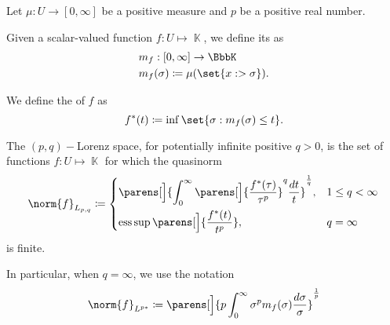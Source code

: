\begin{definition}\label{def:distribution_function}\cite[6]{BerghLofstrom1976}
  Let \( \mu: U \to [0, \infty] \) be a positive measure and \( p \) be a positive real number.

  \begin{thmenum}
     Given a scalar-valued function \( f: U \mapsto \BbbK \), we define its  as
    \begin{align*}
      &m_f: [0, \infty] \to \BbbK \\
      &m_f(\sigma) \coloneqq \mu(\set{ x :  > \sigma }).
    \end{align*}

     We define the  of \( f \) as
    \begin{equation*}
      f^*(t) \coloneqq \inf\set{ \sigma : m_f(\sigma) \leq t }.
    \end{equation*}

     The \( (p, q)-\)Lorenz space, for potentially infinite positive \( q > 0 \), is the set of functions \( f: U \mapsto \BbbK \) for which the quasinorm
    \begin{equation*}
      \norm{f}_{L_{p,q}} \coloneqq \begin{dcases}
        \parens[\Big]{\int_0^\infty \parens[\Big]{\frac {f^*(\tau)} {\tau^p}}^q \frac {d t} t}^{\frac 1 q}, &1 \leq q < \infty \\
        \ess\sup\parens[\Big]{\frac {f^*(t)} {t^p}}, &q = \infty
      \end{dcases}
    \end{equation*}
    is finite.

    In particular, when \( q = \infty \), we use the notation
    \begin{equation*}
      \norm{f}_{L^{p*}} \coloneqq \parens[\Big]{p \int_0^\infty \sigma^p m_f(\sigma) \frac {d \sigma} \sigma}^{\frac 1 p}
    \end{equation*}
  \end{thmenum}
\end{definition}

